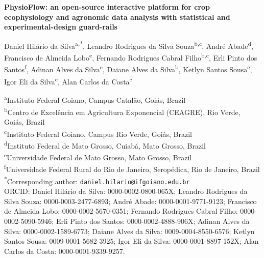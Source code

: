 \documentclass[11pt, letterpaper]{article}
\begin{document}
\begin{center}
{\LARGE\bfseries PhysioFlow: an open-source interactive platform for crop ecophysiology and agronomic data analysis with statistical and experimental-design guard-rails}
\end{center}

\noindent
Daniel Hil\'ario da Silva\textsuperscript{a,*}, Leandro Rodrigues da Silva Souza\textsuperscript{b,c}, Andr\'e Abade\textsuperscript{d}, Francisco de Almeida Lobo\textsuperscript{e}, Fernando Rodrigues Cabral Filho\textsuperscript{b,c}, Erli Pinto dos Santos\textsuperscript{f}, Adinan Alves da Silva\textsuperscript{c}, Daiane Alves da Silva\textsuperscript{b}, Ketlyn Santos Sousa\textsuperscript{c}, Igor Eli da Silva\textsuperscript{c}, Alan Carlos da Costa\textsuperscript{c}

\vspace{0.4em}
\noindent
{\footnotesize
\textsuperscript{a}Instituto Federal Goiano, Campus Catal\~ao, Goi\'as, Brazil\\
\textsuperscript{b}Centro de Excel\^encia em Agricultura Exponencial (CEAGRE), Rio Verde, Goi\'as, Brazil\\
\textsuperscript{c}Instituto Federal Goiano, Campus Rio Verde, Goi\'as, Brazil\\
\textsuperscript{d}Instituto Federal de Mato Grosso, Cuiab\'a, Mato Grosso, Brazil\\
\textsuperscript{e}Universidade Federal de Mato Grosso, Mato Grosso, Brazil\\
\textsuperscript{f}Universidade Federal Rural do Rio de Janeiro, Serop\'edica, Rio de Janeiro, Brazil\\[0.3em]
\textsuperscript{*}Corresponding author: \texttt{daniel.hilario@ifgoiano.edu.br}\\[0.3em]
ORCID: Daniel Hil\'ario da Silva: 0000-0002-0800-065X; Leandro Rodrigues da Silva Souza: 0000-0003-2477-6893; Andr\'e Abade: 0000-0001-9771-9123; Francisco de Almeida Lobo: 0000-0002-5670-0351; Fernando Rodrigues Cabral Filho: 0000-0002-5090-5946; Erli Pinto dos Santos: 0000-0002-4888-906X; Adinan Alves da Silva: 0000-0002-1589-6773; Daiane Alves da Silva: 0009-0004-8550-6576; Ketlyn Santos Sousa: 0009-0001-5682-3925; Igor Eli da Silva: 0000-0001-8897-152X; Alan Carlos da Costa: 0000-0001-9339-9257.
}

\begin{abstract}
\emph{PhysioFlow} is an open-source Python/Streamlit platform for crop-ecophysiology and general agronomic or biological data. It ingests CSV/TSV/XLSX exports, validates them against an explicit schema, and offers a configurable replicate pipeline, exploratory analysis with statistical guard-rails (confounding, multicollinearity, normality and multi-method outlier checks), supervised regression and classification with optional GroupKFold, geospatial analysis in UTM metres, STL decomposition, and a formal experimental-design module (from completely randomised and block designs to factorial, Latin square, split-plot, strip-plot, nested, ANCOVA and dose-response) cross-validated against R. An automatic data-profile makes it dataset-agnostic beyond ecophysiology. Released under GPL-2.0, it runs code-free in a trilingual (PT/EN/ES) interface.
\end{abstract}
\end{document}
